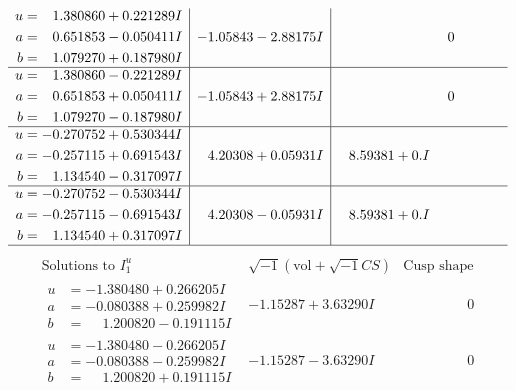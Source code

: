 \documentclass[1p]{elsarticle_modified}
\theoremstyle{definition}
\newcommand{\I}{\sqrt{-1}}
\begin{document}
$$\begin{array}{c|c|c}
\begin{aligned}
u &= \phantom{-}1.380860 + 0.221289 I \\
a &= \phantom{-}0.651853 - 0.050411 I \\
b &= \phantom{-}1.079270 + 0.187980 I\end{aligned}
 & -1.05843 - 2.88175 I & \phantom{-0.000000 } 0 \\ \hline\begin{aligned}
u &= \phantom{-}1.380860 - 0.221289 I \\
a &= \phantom{-}0.651853 + 0.050411 I \\
b &= \phantom{-}1.079270 - 0.187980 I\end{aligned}
 & -1.05843 + 2.88175 I & \phantom{-0.000000 } 0 \\ \hline\begin{aligned}
u &= -0.270752 + 0.530344 I \\
a &= -0.257115 + 0.691543 I \\
b &= \phantom{-}1.134540 - 0.317097 I\end{aligned}
 & \phantom{-}4.20308 + 0.05931 I & \phantom{-}8.59381 + 0. I\phantom{ +0.000000I} \\ \hline\begin{aligned}
u &= -0.270752 - 0.530344 I \\
a &= -0.257115 - 0.691543 I \\
b &= \phantom{-}1.134540 + 0.317097 I\end{aligned}
 & \phantom{-}4.20308 - 0.05931 I & \phantom{-}8.59381 + 0. I\phantom{ +0.000000I}\\
 \hline 
 \end{array}$$\newpage$$\begin{array}{c|c|c}  
\text{Solutions to }I^u_{1}& \I (\text{vol} + \sqrt{-1}CS) & \text{Cusp shape}\\
 \hline 
\begin{aligned}
u &= -1.380480 + 0.266205 I \\
a &= -0.080388 + 0.259982 I \\
b &= \phantom{-}1.200820 - 0.191115 I\end{aligned}
 & -1.15287 + 3.63290 I & \phantom{-0.000000 } 0 \\ \hline\begin{aligned}
u &= -1.380480 - 0.266205 I \\
a &= -0.080388 - 0.259982 I \\
b &= \phantom{-}1.200820 + 0.191115 I\end{aligned}
 & -1.15287 - 3.63290 I & \phantom{-0.000000 } 0 \\ \hline\begin{aligned}

\end{aligned}
\end{array}$$
\end{document}
